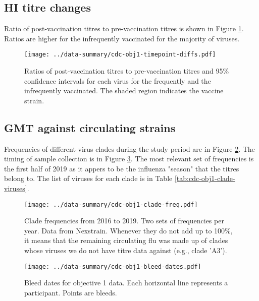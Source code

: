 \documentclass[12pt]{article}
\begin{document}
\subsection{HI titre changes}

Ratio of post-vaccination titres to pre-vaccination titres is shown in Figure
\ref{fig:cdc-obj1-timepoint-diffs}. Ratios are higher for the infrequently
vaccinated for the majority of viruses.

\begin{figure}
	\texttt{[image: ../data-summary/cdc-obj1-timepoint-diffs.pdf]}
	\caption{Ratios of post-vaccination titres to pre-vaccination titres and 95\% confidence intervals for each virus for the frequently and the infrequently vaccinated. The shaded region indicates the vaccine strain.}
	\label{fig:cdc-obj1-timepoint-diffs}
\end{figure}

\subsection{GMT against circulating strains}

Frequencies of different virus clades during the study period are in Figure \ref{fig:cdc-obj1-clade-freq}. The timing of sample collection is in Figure \ref{fig:cdc-obj1-bleed-dates}. The most relevant set of frequencies is the first half of 2019 as it appers to be the influenza "season" that the titres belong to. The list of viruses for each clade is in Table \ref{tab:cdc-obj1-clade-viruses}.

\begin{figure}
	\texttt{[image: ../data-summary/cdc-obj1-clade-freq.pdf]}
	\caption{Clade frequencies from 2016 to 2019. Two sets of frequencies per year. Data from Nexstrain. Whenever they do not add up to 100\%, it means that the remaining circulating flu was made up of clades whose viruses we do not have titre data against (e.g., clade 'A3').}
	\label{fig:cdc-obj1-clade-freq}
\end{figure}

\begin{figure}
	\texttt{[image: ../data-summary/cdc-obj1-bleed-dates.pdf]}
	\caption{Bleed dates for objective 1 data. Each horizontal line represents a participant. Points are bleeds.}
	\label{fig:cdc-obj1-bleed-dates}
\end{figure}
\end{document}
